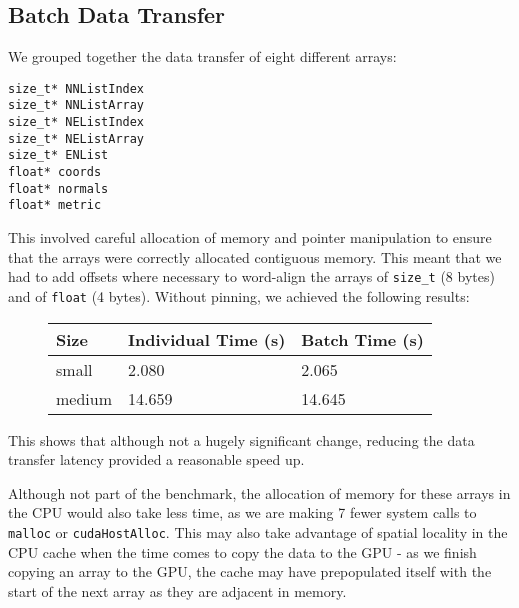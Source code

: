 \subsection{Batch Data Transfer}
We grouped together the data transfer of eight different arrays:
\begin{verbatim}
size_t* NNListIndex
size_t* NNListArray
size_t* NEListIndex
size_t* NEListArray
size_t* ENList
float* coords
float* normals
float* metric
\end{verbatim}

This involved careful allocation of memory and pointer manipulation to ensure that the arrays were correctly allocated contiguous memory. This meant that we had to add offsets where necessary to word-align the arrays of \verb!size_t! (8 bytes) and of \verb!float! (4 bytes). Without pinning, we achieved the following results:

\begin{figure}[H]\centering \begin{tabular}{ l | l | l}
  \hline
  Size & Individual Time (s) & Batch Time (s)\\
  \hline
  \hline
  small & 2.080 & 2.065 \\
  medium & 14.659 & 14.645 \\
  \hline
\end{tabular} \end{figure}

This shows that although not a hugely significant change, reducing the data transfer latency provided a reasonable speed up.

Although not part of the benchmark, the allocation of memory for these arrays in the CPU would also take less time, as we are making 7 fewer system calls to \verb!malloc! or \verb!cudaHostAlloc!. This may also take advantage of spatial locality in the CPU cache when the time comes to copy the data to the GPU - as we finish copying an array to the GPU, the cache may have prepopulated itself with the start of the next array as they are adjacent in memory. %
